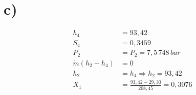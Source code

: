 

\section*{c)}

\begin{align*}
    h_4 &= 93,42 \\
    S_4 &= 0,3459 \\
    P_2 &= P_2 = 7,5 \, 748 \, bar \\
    \dot{m}(h_2 - h_4) &= 0 \\
    h_2 &= h_4 \Rightarrow h_2 = 93,42 \\
    X_1 &= \frac{93,42 - 29,30}{208,45} = 0,3076
\end{align*}
